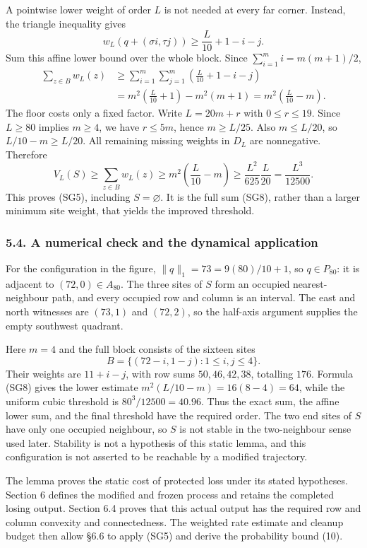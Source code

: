 \documentclass[
  11pt,
  a4paper,
]{article}
\begin{document}
A pointwise lower weight of order \(L\) is not needed at every far
corner. Instead, the triangle inequality gives \[
w_L(q+(\sigma i,\tau j))
\geq\frac L{10}+1-i-j.
\] Sum this affine lower bound over the whole block. Since
\(\sum_{i=1}^m i=m(m+1)/2\), \[
\begin{aligned}
\sum_{z\in B}w_L(z)
&\geq \sum_{i=1}^m\sum_{j=1}^m
     \left(\frac L{10}+1-i-j\right)\\
&=m^2\left(\frac L{10}+1\right)-m^2(m+1)
=m^2\left(\frac L{10}-m\right).
\end{aligned}
\tag{SG8}
\] The floor costs only a fixed factor. Write \(L=20m+r\) with
\(0\leq r\leq19\). Since \(L\geq80\) implies \(m\geq4\), we have
\(r\leq5m\), hence \(m\geq L/25\). Also \(m\leq L/20\), so
\(L/10-m\geq L/20\). All remaining missing weights in \(D_L\) are
nonnegative. Therefore \[
V_L(S)\geq\sum_{z\in B}w_L(z)
\geq m^2\left(\frac L{10}-m\right)
\geq\frac{L^2}{625}\frac L{20}
=\frac{L^3}{12500}.
\] This proves (SG5), including \(S=\varnothing\). It is the full sum
(SG8), rather than a larger minimum site weight, that yields the
improved threshold.

\subsubsection{5.4. A numerical check and the dynamical
application}\label{a-numerical-check-and-the-dynamical-application}

For the configuration in the figure, \(\|q\|_1=73=9(80)/10+1\), so
\(q\in P_{80}\): it is adjacent to \((72,0)\in A_{80}\). The three sites
of \(S\) form an occupied nearest-neighbour path, and every occupied row
and column is an interval. The east and north witnesses are \((73,1)\)
and \((72,2)\), so the half-axis argument supplies the empty southwest
quadrant.

Here \(m=4\) and the full block consists of the sixteen sites \[
B=\{(72-i,1-j):1\leq i,j\leq4\}.
\] Their weights are \(11+i-j\), with row sums \(50,46,42,38\),
totalling \(176\). Formula (SG8) gives the lower estimate
\(m^2(L/10-m)=16(8-4)=64\), while the uniform cubic threshold is
\(80^3/12500=40.96\). Thus the exact sum, the affine lower sum, and the
final threshold have the required order. The two end sites of \(S\) have
only one occupied neighbour, so \(S\) is not stable in the two-neighbour
sense used later. Stability is not a hypothesis of this static lemma,
and this configuration is not asserted to be reachable by a modified
trajectory.

The lemma proves the static cost of protected loss under its stated
hypotheses. Section 6 defines the modified and frozen process and
retains the completed losing output. Section 6.4 proves that this actual
output has the required row and column convexity and connectedness. The
weighted rate estimate and cleanup budget then allow §6.6 to apply (SG5)
and derive the probability bound (10).
\end{document}
